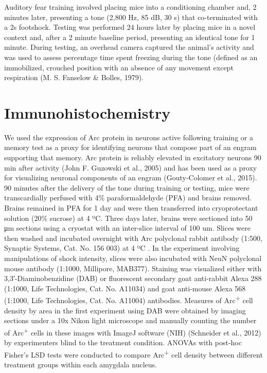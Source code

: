 \documentclass[12pt,a4paper,]{report}
\begin{document}
Auditory fear training involved placing mice into a conditioning chamber
and, 2 minutes later, presenting a tone (2,800 Hz, 85 dB, 30 s) that
co-terminated with a 2s footshock. Testing was performed 24 hours later
by placing mice in a novel context and, after a 2 minute baseline
period, presenting an identical tone for 1 minute. During testing, an
overhead camera captured the animal's activity and was used to assess
percentage time spent freezing during the tone (defined as an
immobilized, crouched position with an absence of any movement except
respiration (M. S. Fanselow \& Bolles, 1979).

\section{Immunohistochemistry}\label{immunohistochemistry}

We used the expression of Arc protein in neurons active following
training or a memory test as a proxy for identifying neurons that
compose part of an engram supporting that memory. Arc protein is
reliably elevated in excitatory neurons 90 min after activity (John F.
Guzowski et al., 2005) and has been used as a proxy for visualizing
neuronal components of an engram (Gouty-Colomer et al., 2015). 90
minutes after the delivery of the tone during training or testing, mice
were transcardially perfused with 4\% paraformaldehyde (PFA) and brains
removed. Brains remained in PFA for 1 day and were then transferred into
cryoprotectant solution (20\% sucrose) at 4 ºC. Three days later, brains
were sectioned into 50 μm sections using a cryostat with an inter-slice
interval of 100 um. Slices were then washed and incubated overnight with
Arc polyclonal rabbit antibody (1:500, Synaptic Systems, Cat. No. 156
003) at 4 ºC . In the experiment involving manipulations of shock
intensity, slices were also incubated with NeuN polyclonal mouse
antibody (1:1000, Millipore, MAB377). Staining was visualized either
with 3,3′-Diaminobenzidine (DAB) or fluorescent secondary goat
anti-rabbit Alexa 288 (1:1000, Life Technologies, Cat. No. A11034) and
goat anti-mouse Alexa 568 (1:1000, Life Technologies, Cat. No. A11004)
antibodies. Measures of Arc\textsuperscript{+} cell density by area in
the first experiment using DAB were obtained by imaging sections under a
10x Nikon light microscope and manually counting the number of
Arc\textsuperscript{+} cells in these images with ImageJ software (NIH)
(Schneider et al., 2012) by experimenters blind to the treatment
condition. ANOVAs with post-hoc Fisher's LSD tests were conducted to
compare Arc\textsuperscript{+} cell density between different treatment
groups within each amygdala nucleus.
\end{document}
